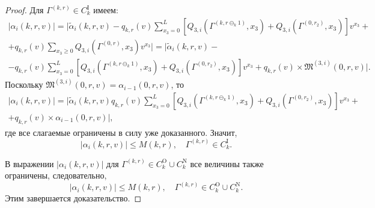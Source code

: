 \begin{proof}
Для $\Gamma^{(k,  r)} \in C_{k}^{\mathrm{I}}$ имеем:
\begin{multline*}
|\alpha_i(k, r, v) |=|\tilde{\alpha}_i(k, r, v) - q_{k, r}(v)\sum_{x_3=0}^{L} \left[ Q_{3, i}(\Gamma^{(k, r\ominus_k 1)}, x_3) + Q_{3, i}(\Gamma^{(0, r_2)}, x_3) \right] v^{x_3}+\\  +q_{{k}, {r}}(v)  \sum_{x_3\geqslant 0} Q_{3, i}(\Gamma^{(0, {r})}, x_3) v^{x_3}| = |\tilde{\alpha}_i(k, r, v)  -\\- q_{k, r}(v) \sum_{x_3=0}^{L} \left[ Q_{3, i}(\Gamma^{(k, r\ominus_k 1)}, x_3) + Q_{3, i}(\Gamma^{(0, r_2)}, x_3) \right] v^{x_3} + q_{{k}, {r}}(v)\times \mathfrak{M}^{(3, i)}(0, r, v) |.
\end{multline*}
Поскольку $\mathfrak{M}^{(3, i)}(0, r, v) = \alpha_{i-1}(0, r, v)$,  то 
\begin{multline*}
|\alpha_i(k, r, v) |= |\tilde{\alpha}_i(k, r, v)   q_{k, r}(v) \sum_{x_3=0}^{L} \left[ Q_{3, i}(\Gamma^{(k, r\ominus_k 1)}, x_3) + Q_{3, i}(\Gamma^{(0, r_2)}, x_3) \right] v^{x_3} + \\+q_{{k}, {r}}(v)\times \alpha_{i-1}(0, r, v)|, 
\end{multline*}
где все слагаемые ограничены в силу уже доказанного. Значит, 
\begin{equation*}
|\alpha_i(k, r, v) |\leqslant M(k, r),  \quad \Gamma^{(k,  r)} \in C_{k}^{\mathrm{I}}.
\end{equation*}

В выражении $|\alpha_i(k, r, v)| $ для $\Gamma^{(k,  r)} \in C_{k}^{\mathrm{O}} \cup C_{k}^{\mathrm{N}}$  все величины также ограничены,  следовательно, 
\begin{equation*}
|\alpha_i(k, r, v) |\leqslant M(k, r),  \quad \Gamma^{(k,  r)} \in C_{k}^{\mathrm{O}} \cup C_{k}^{\mathrm{N}}.
\end{equation*}
Этим завершается доказательство.

\end{proof}

